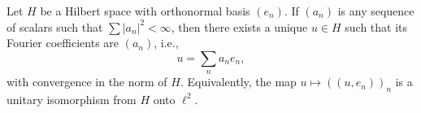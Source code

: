 Let $H$ be a Hilbert space with orthonormal basis $(e_n)$. If $(a_n)$ is any sequence of scalars such that $\sum |a_n|^2 < \infty$, then there exists a unique $u \in H$ such that its Fourier coefficients are $(a_n)$, i.e.,
$$u = \sum_{n} a_n e_n,$$
with convergence in the norm of $H$. Equivalently, the map $u \mapsto ((u, e_n))_n$ is a unitary isomorphism from $H$ onto $\ell^2$.
